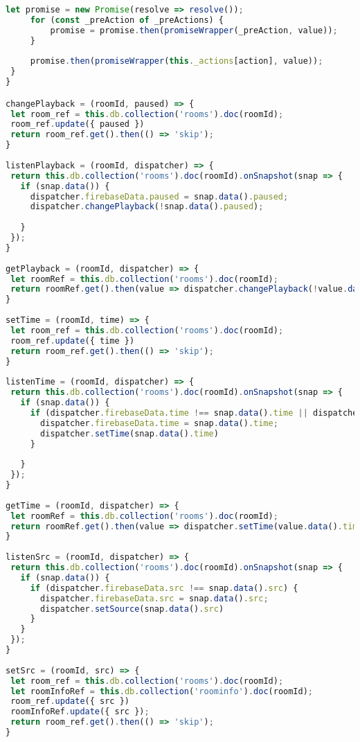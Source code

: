 \begin{lstlisting}[language=JavaScript,label={lst:add:player}]
     let promise = new Promise(resolve => resolve());
     for (const _preAction of _preActions) {
         promise = promise.then(promiseWrapper(_preAction, value));
     }
 
     promise.then(promiseWrapper(this._actions[action], value));
 }
}

changePlayback = (roomId, paused) => {
 let room_ref = this.db.collection('rooms').doc(roomId);
 room_ref.update({ paused })
 return room_ref.get().then(() => 'skip');
}
 
listenPlayback = (roomId, dispatcher) => {
 return this.db.collection('rooms').doc(roomId).onSnapshot(snap => {
   if (snap.data()) {
     dispatcher.firebaseData.paused = snap.data().paused;
     dispatcher.changePlayback(!snap.data().paused);
 
   }
 });
}
 
getPlayback = (roomId, dispatcher) => {
 let roomRef = this.db.collection('rooms').doc(roomId);
 return roomRef.get().then(value => dispatcher.changePlayback(!value.data().paused));
}
 
setTime = (roomId, time) => {
 let room_ref = this.db.collection('rooms').doc(roomId);
 room_ref.update({ time })
 return room_ref.get().then(() => 'skip');
}
 
listenTime = (roomId, dispatcher) => {
 return this.db.collection('rooms').doc(roomId).onSnapshot(snap => {
   if (snap.data()) {
     if (dispatcher.firebaseData.time !== snap.data().time || dispatcher.firebaseData.src != snap.data().src) {
       dispatcher.firebaseData.time = snap.data().time;
       dispatcher.setTime(snap.data().time)
     }
 
   }
 });
}
 
getTime = (roomId, dispatcher) => {
 let roomRef = this.db.collection('rooms').doc(roomId);
 return roomRef.get().then(value => dispatcher.setTime(value.data().time || 0));
}
 
listenSrc = (roomId, dispatcher) => {
 return this.db.collection('rooms').doc(roomId).onSnapshot(snap => {
   if (snap.data()) {
     if (dispatcher.firebaseData.src !== snap.data().src) {
       dispatcher.firebaseData.src = snap.data().src;
       dispatcher.setSource(snap.data().src)
     }
   }
 });
}
 
setSrc = (roomId, src) => {
 let room_ref = this.db.collection('rooms').doc(roomId);
 let roomInfoRef = this.db.collection('roominfo').doc(roomId);
 room_ref.update({ src })
 roomInfoRef.update({ src });
 return room_ref.get().then(() => 'skip');
}
 

\end{lstlisting}
